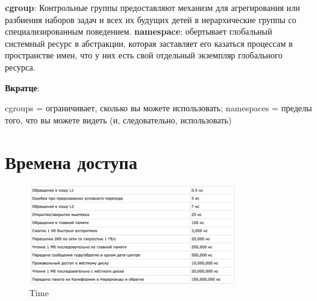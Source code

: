 \textbf{cgroup}: Контрольные группы предоставляют механизм для агрегирования или разбиения наборов задач и всех их будущих детей в иерархические группы со специализированным поведением.
\textbf{namespace}: обертывает глобальный системный ресурс в абстракции, которая заставляет его казаться процессам в пространстве имен, что у них есть свой отдельный экземпляр глобального ресурса.

\textbf{Вкратце}:

     cgroups = ограничивает, сколько вы можете использовать;
     namespaces = пределы того, что вы можете видеть (и, следовательно, использовать)

\section{Времена доступа}

\begin{figure}[h!]
\centering
\includegraphics[width=0.8\textwidth]{img/time.png}
\caption{Time}
\label{time}
\end{figure}

